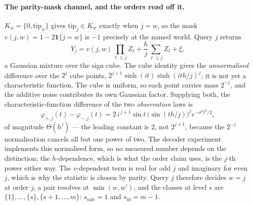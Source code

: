 
\paragraph{The parity-mask channel, and the orders read off it.}
$K_{w}=\{0,\mathrm{tip}_{w}\}$ gives $\mathrm{tip}_{j}\in K_{w}$ exactly when $j=w$, so the
mask $v(j,w)=1-2\mathbf1\{j=w\}$ is $-1$ precisely at the named world. Query $j$ returns
\[
Y_{j}=v(j,w)\prod_{\ell\le j}Z_{\ell}+\frac hj\sum_{\ell\le j}Z_{\ell}+\xi ,
\]
a Gaussian mixture over the sign cube. The cube identity  gives
the \emph{unnormalised} difference over the $2^{j}$ cube points,
$2^{j+1}\sinh(it)\sinh(ith/j)^{j}$; it is not yet a characteristic function. The cube is
uniform, so each point carries mass $2^{-j}$, and the additive noise contributes its own
Gaussian factor. Supplying both, the characteristic-function difference of the two
\emph{observation} laws is
\[
\varphi_{+,j}(t)-\varphi_{-,j}(t)
=2\,i^{\,j+1}\sin t\,\bigl(\sin (th/j)\bigr)^{j}e^{-\sigma^{2}t^{2}/2},
\]
of magnitude $\Theta(h^{j})$ --- the leading constant is $2$, not $2^{j+1}$, because the
$2^{-j}$ normalisation cancels all but one power of two. The decoder experiment implements
this normalised form, so no measured number depends on the distinction; the $h$-dependence,
which is what the order claim uses, is the $j$-th power either way. The $v$-dependent term is real for odd $j$ and imaginary for even
$j$, which is why the statistic is chosen by parity. Query $j$ therefore decides $w=j$ at
order $j$, a pair resolves at $\min(w,w')$, and the classes at level $s$ are
$\{1\},\dots,\{s\},\{s+1,\dots,m\}$: $s_{\mathrm{safe}}=1$ and $s_{\mathrm{id}}=m-1$.



